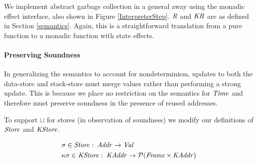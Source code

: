 We implement abstract garbage collection in a general away using the
monadic effect interface, also shown in Figure \ref{InterpreterStep}.
$ \operatorname{\mathit{R}} $ and $ \operatorname{\mathit{KR}} $ are as defined in Section
\ref{semantics}. Again, this is a straightforward translation from a
pure function to a monadic function with state effects.

\par

\paragraph{Preserving Soundness}

In generalizing the semantics to account for nondeterminism, updates to
both the data-store and stack-store must merge values rather than
performing a strong update. This is because we place no restriction on
the semantics for $ \operatorname{\mathit{Time}} $ and therefore must preserve soundness
in the presence of reused addresses.

\par

To support $ \sqcup $ for stores (in observation of soundness) we modify
our definitions of $ \operatorname{\mathit{Store}} $ and $ \operatorname{\mathit{KStore}} $.

\small\begin{align*}
&\hspace{0em}  \sigma    \in   \operatorname{\mathit{Store}}    \mathbin{\colon}   \operatorname{\mathit{Addr}}   \rightarrow   \operatorname{\mathit{Val}}  \\
&\hspace{0em}  \kappa  \sigma   \in   \operatorname{\mathit{KStore}}   \mathbin{\colon}   \operatorname{\mathit{KAddr}}   \rightarrow   \mathcal{P}  (\operatorname{\mathit{Frame}}   \times   \operatorname{\mathit{KAddr}}) 
\end{align*}\normalsize

\par


